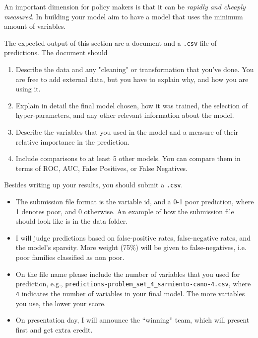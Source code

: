 \documentclass[12pt,onecolumn,A4]{article}
\begin{document}
An important dimension for policy makers is that it can be {\it rapidly and cheaply measured}. In building your model aim to have a model that uses the minimum amount of variables. 


The expected output of this section are a document and a \texttt{.csv} file of predictions. The document should


\begin{enumerate}
	\item Describe the data and any "cleaning" or transformation that you've done. You are free to add external data, but you have to explain why, and how you are using it. 
	\item Explain in detail the final model chosen, how it was trained, the selection of hyper-parameters, and any other relevant information about the model. 
  \item Describe the variables that you used in the model and a measure of their relative importance in the prediction. 
  \item Include comparisons to at least 5 other models. You can compare them in terms of ROC, AUC, False Positives, or False Negatives.
  
	\end{enumerate}
Besides writing up your results, you should submit a \texttt{.csv}.
  \begin{itemize}
   \item The submission file format is the variable id, and a 0-1 poor prediction, where 1 denotes poor, and 0 otherwise. An example of how the submission file should look like is in the data folder. 
   
   \item I will judge predictions based on false-positive rates, false-negative rates, and the model's sparsity. More weight (75\%) will be given to false-negatives, i.e. poor families classified as non poor.
   \item On the file name please include the number of variables that you used for prediction, e.g., \texttt{predictions-problem\_set\_4\_sarmiento-cano-4.csv}, where \texttt{4} indicates the number of variables in your final model. The more variables you use, the lower your score.
   \item On presentation day, I will announce the ``winning'' team, which will present first and get extra credit. 

   \end{itemize}
\end{document}
